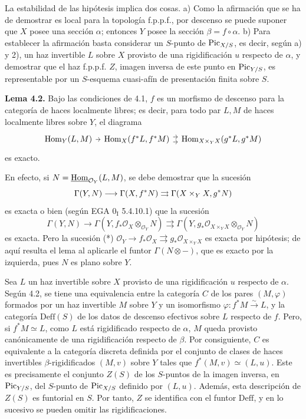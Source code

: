 La estabilidad de las hipótesis implica dos cosas. a) Como la afirmación
que se ha de demostrar es local para la topología f.p.p.f., por descenso se
puede suponer que $X$ posee una sección $\alpha$; entonces $Y$ posee la
sección $\beta=f\circ\alpha$. b) Para establecer la afirmación basta
considerar un $S$-punto de $\operatorname{Pic}_{X/S}$, es decir, según a) y 2), un haz
invertible $L$ sobre $X$ provisto de una rigidificación $u$ respecto de
$\alpha$, y demostrar que el haz f.p.p.f. $Z$, imagen inversa de este punto
en $\operatorname{Pic}_{Y/S}$, es representable por un $S$-esquema cuasi-afín de
presentación finita sobre $S$.

\textbf{Lema 4.2.} Bajo las condiciones de 4.1, $f$ es un morfismo de
descenso para la categoría de haces localmente libres; es decir, para todo
par $L,M$ de haces localmente libres sobre $Y$, el diagrama
\[
\begin{tikzcd}[column sep=tiny]
\Hom_Y(L,M) \arrow[r] &
\Hom_X(f^*L,f^*M) \arrow[r,shift left=.7ex] \arrow[r,shift right=.7ex] &
\Hom_{X\times_YX}(g^*L,g^*M)
\end{tikzcd}
\]
es exacto.

En efecto, si $N=\underline{\operatorname{Hom}}_{\mathcal O_Y}(L,M)$, se debe demostrar que la
sucesión
\[
\sisi{\Gamma\ Y,N)}{\Gamma(Y,N)}\longrightarrow\Gamma(X,f^*N)
\rightrightarrows
\Gamma(X\times_YX,g^*N)
\]
es exacta o bien (según EGA $0_{\mathrm I}$ 5.4.10.1) que la sucesión
\[
\Gamma(Y,N)\longrightarrow
\Gamma(Y,f_*\mathcal O_X\otimes_{\mathcal O_Y}N)
\rightrightarrows
\Gamma(Y,g_*\mathcal O_{X\times_YX}\otimes_{\mathcal O_Y}N)
\]
es exacta. Pero la sucesión (*)
$\mathcal O_Y\to f_*\mathcal O_X\rightrightarrows
g_*\mathcal O_{X\times_YX}$ es exacta por hipótesis; de aquí resulta el
lema al aplicarle el funtor $\Gamma(N\otimes -)$, que es exacto por la
izquierda, pues $N$ es plano sobre $Y$.

Sea $L$ un haz invertible sobre $X$ provisto de una rigidificación $u$
respecto de $\alpha$. Según 4.2, se tiene una equivalencia entre la categoría
$C$ de los pares $(M,\varphi)$ formados por un haz invertible $M$ sobre $Y$
y un isomorfismo $\varphi:f^*M\xrightarrow{\sim}L$, y la categoría
$\mathrm{Deff}(S)$ de los datos de descenso efectivos sobre $L$ respecto de
$f$. Pero, si $f^*M\simeq L$, como $L$ está rigidificado respecto de
$\alpha$, $M$ queda provisto canónicamente de una rigidificación respecto de
$\beta$. Por consiguiente, $C$ es equivalente a la categoría discreta
definida por el conjunto de clases de haces invertibles $\beta$-rigidificados
$(M,v)$ sobre $Y$ tales que $f^*(M,v)\simeq(L,u)$. Este es precisamente el
conjunto $Z(S)$ de los $S$-puntos de la imagen inversa, en $\operatorname{Pic}_{Y/S}$, del
$S$-punto de $\operatorname{Pic}_{X/S}$ definido por $(L,u)$. Además, esta descripción de
$Z(S)$ es funtorial en $S$. Por tanto, $Z$ se identifica con el funtor
$\mathrm{Deff}$, y en lo sucesivo se pueden omitir las rigidificaciones.

